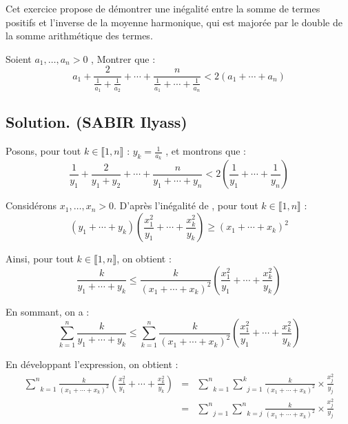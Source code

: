 Cet exercice propose de d{\'e}montrer une in{\'e}galit{\'e} entre la somme de
termes positifs et l'inverse de la moyenne harmonique, qui est major{\'e}e par
le double de la somme arithm{\'e}tique des termes.

\begin{exercise}[]
Soient $a_1, \ldots, a_n > 0$ , Montrer que :
\[ a_1 + \frac{2}{\frac{1}{a_1} + \frac{1}{a_2}} + \cdots +
   \frac{n}{\frac{1}{a_1} + \cdots + \frac{1}{a_n}} < 2 (a_1 + \cdots + a_n)
\]
\end{exercise}

\subsection*{Solution. (SABIR Ilyass)}

Posons, pour tout $k \in \llbracket 1, n \rrbracket$ : $y_k = \frac{1}{a_k}$ ,
et montrons que :
\[ \frac{1}{y_1} + \frac{2}{y_1 + y_2} + \cdots + \frac{n}{y_1 + \cdots + y_n}
   < 2 \left( \frac{1}{y_1} + \cdots + \frac{1}{y_n} \right) \]


Consid{\'e}rons $x_1, \ldots, x_n > 0$. D'apr{\`e}s l'in{\'e}galit{\'e} de
, pour tout $k \in \llbracket 1, n \rrbracket$
:
\[ (y_1 + \cdots + y_k) \left( \frac{x^2_1}{y_1} + \cdots + \frac{x^2_k}{y_k}
   \right) \geqslant (x_1 + \cdots + x_k)^2 \]


Ainsi, pour tout $k \in \llbracket 1, n \rrbracket$, on obtient :
\[ \frac{k}{y_1 + \cdots + y_k} \leqslant \frac{k}{(x_1 + \cdots + x_k)^2}
   \left( \frac{x^2_1}{y_1} + \cdots + \frac{x^2_k}{y_k} \right) \]


En sommant, on a :
\[ \underset{k = 1}{\overset{n}{\sum}} \frac{k}{y_1 + \cdots + y_k} \leqslant
   \underset{k = 1}{\overset{n}{\sum}} \frac{k}{(x_1 + \cdots + x_k)^2} \left(
   \frac{x^2_1}{y_1} + \cdots + \frac{x^2_k}{y_k} \right) \]


En d{\'e}veloppant l'expression, on obtient :
\begin{eqnarray*}
  \underset{k = 1}{\overset{n}{\sum}} \frac{k}{(x_1 + \cdots + x_k)^2} \left(
  \frac{x^2_1}{y_1} + \cdots + \frac{x^2_k}{y_k} \right) & = & \underset{k =
  1}{\overset{n}{\sum}} \underset{j = 1}{\overset{k}{\sum}} \frac{k}{(x_1 +
  \cdots + x_k)^2} \times \frac{x_j^2}{y_j}\\
  & = & \underset{j = 1}{\overset{n}{\sum}} \underset{k =
  j}{\overset{n}{\sum}} \frac{k}{(x_1 + \cdots + x_k)^2} \times
  \frac{x_j^2}{y_j}
\end{eqnarray*}


